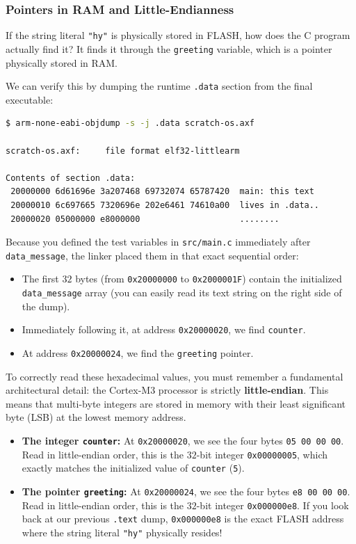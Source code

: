 \subsubsection{Pointers in RAM and Little-Endianness}
If the string literal \texttt{"hy"} is physically stored in FLASH, how does the C program actually find it? It finds it through the \texttt{greeting} variable, which is a pointer physically stored in RAM. 

We can verify this by dumping the runtime \texttt{.data} section from the final executable:
\begin{lstlisting}[language=bash]
$ arm-none-eabi-objdump -s -j .data scratch-os.axf

scratch-os.axf:     file format elf32-littlearm

Contents of section .data:
 20000000 6d61696e 3a207468 69732074 65787420  main: this text 
 20000010 6c697665 7320696e 202e6461 74610a00  lives in .data..
 20000020 05000000 e8000000                    ........
\end{lstlisting}

Because you defined the test variables in \texttt{src/main.c} immediately after \texttt{data\_message}, the linker placed them in that exact sequential order:
\begin{itemize}
    \item The first $32$ bytes (from \texttt{0x20000000} to \texttt{0x2000001F}) contain the initialized \texttt{data\_message} array (you can easily read its text string on the right side of the dump).
    \item Immediately following it, at address \texttt{0x20000020}, we find \texttt{counter}.
    \item At address \texttt{0x20000024}, we find the \texttt{greeting} pointer.
\end{itemize}

To correctly read these hexadecimal values, you must remember a fundamental architectural detail: the Cortex-M3 processor is strictly \textbf{little-endian}. This means that multi-byte integers are stored in memory with their least significant byte (LSB) at the lowest memory address.

\begin{itemize}
    \item \textbf{The integer \texttt{counter}:} At \texttt{0x20000020}, we see the four bytes \texttt{05 00 00 00}. Read in little-endian order, this is the $32$-bit integer \texttt{0x00000005}, which exactly matches the initialized value of \texttt{counter} (\texttt{5}).
    \item \textbf{The pointer \texttt{greeting}:} At \texttt{0x20000024}, we see the four bytes \texttt{e8 00 00 00}. Read in little-endian order, this is the $32$-bit integer \texttt{0x000000e8}. If you look back at our previous \texttt{.text} dump, \texttt{0x000000e8} is the exact FLASH address where the string literal \texttt{"hy"} physically resides!
\end{itemize}

